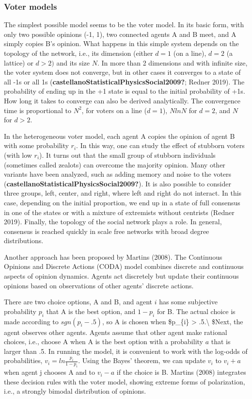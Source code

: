 \documentclass[
  letterpaper,
]{scrbook}
\begin{document}
\hypertarget{voter-models}{%
\subsubsection{Voter models}\label{voter-models}}

The simplest possible model seems to be the voter model. In its basic
form, with only two possible opinions (-1, 1), two connected agents A
and B meet, and A simply copies B's opinion. What happens in this simple
system depends on the topology of the network, i.e., its dimension
(either \(d = 1\) (on a line), \(d = 2\) (a lattice) or \(d > 2)\) and
its size \(N\). In more than 2 dimensions and with infinite size, the
voter system does not converge, but in other cases it converges to a
state of all -1s or all 1s
(\textbf{castellanoStatisticalPhysicsSocial2009?}; Redner 2019). The
probability of ending up in the +1 state is equal to the initial
probability of +1s. How long it takes to converge can also be derived
analytically. The convergence time is proportional to \(N^{2}\), for
voters on a line (\(d = 1\)), \(NlnN\) for \(d = 2\), and \(N\) for
\(d > 2\).

In the heterogeneous voter model, each agent A copies the opinion of
agent B with some probability \(r_{i}\). In this way, one can study the
effect of stubborn voters (with low \(r_{i}\)). It turns out that the
small group of stubborn individuals (sometimes called zealots) can
overcome the majority opinion. Many other variants have been analyzed,
such as adding memory and noise to the voters
(\textbf{castellanoStatisticalPhysicsSocial2009?}). It is also possible
to consider three groups, left, center, and right, where left and right
do not interact. In this case, depending on the initial proportion, we
end up in a state of full consensus in one of the states or with a
mixture of extremists without centrists (Redner 2019). Finally, the
topology of the social network plays a role. In general, consensus is
reached quickly in scale free networks with broad degree distributions.

Another approach has been proposed by Martins (2008). The Continuous
Opinions and Discrete Actions (CODA) model combines discrete and
continuous aspects of opinion dynamics. Agents act discretely but update
their continuous opinions based on observations of other agents'
discrete actions.

There are two choice options, A and B, and agent \(i\) has some
subjective probability \(p_{i}\) that A is the best option, and
\({1 - p}_{i}\) for B. The actual choice is made according to
\(sgn\left( p_{i} - .5 \right)\), so A is chosen when \$p\_\{i\}
\textgreater{} .5.\textbackslash{} \$Next, the agent observes other
agents. Agents assume that other agent make rational choices, i.e.,
choose A when A is the best option with a probability \(a\) that is
larger than .5. In running the model, it is convenient to work with the
log-odds of probabilities, \(v_{i} = ln\frac{p_{i}}{1 - p_{i}}\). Using
the Bayes' theorem, we can update \(v_{i}\) to \(v_{i} + a\) when agent
j chooses A and to \(v_{i} - a\) if the choice is B. Martins (2008)
integrates these decision rules with the voter model, showing extreme
forms of polarization, i.e., a strongly bimodal distribution of
opinions.
\end{document}
